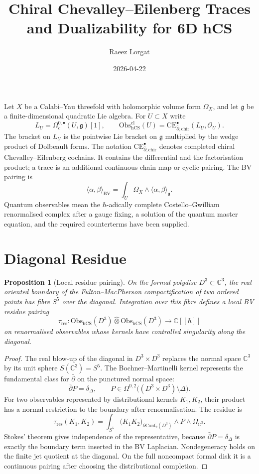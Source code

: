 \documentclass[11pt]{amsart}
\title{Chiral Chevalley--Eilenberg Traces and Dualizability for 6D hCS}
\author{Raeez Lorgat}
\date{2026-04-22}
\providecommand{\C}{\mathbb{C}}
\providecommand{\hb}{\hbar}
\providecommand{\dbar}{\bar{\partial}}
\providecommand{\Obs}{\mathrm{Obs}}
\providecommand{\hCS}{\mathrm{hCS}}
\providecommand{\CE}{\mathrm{CE}}
\providecommand{\cConf}{\overline{\mathrm{Conf}}}
\providecommand{\chir}{\mathrm{chir}}
\providecommand{\cO}{\mathcal{O}}
\providecommand{\g}{\mathfrak{g}}
\providecommand{\BV}{\mathrm{BV}}
\theoremstyle{plain}
\newtheorem{proposition}[theorem]{Proposition}
\theoremstyle{definition}
\theoremstyle{remark}
\begin{document}
\maketitle

Let $X$ be a Calabi--Yau threefold with holomorphic volume form
$\Omega_X$, and let $\g$ be a finite-dimensional quadratic Lie algebra.
For $U\subset X$ write
\[
 L_U=\Omega_c^{0,\bullet}(U,\g)[1],
 \qquad
 \Obs_{\hCS}^{\mathrm{cl}}(U)=\CE^\bullet_{\dbar,\chir}(L_U,\cO_U).
\]
The bracket on $L_U$ is the pointwise Lie bracket on $\g$ multiplied by
the wedge product of Dolbeault forms. The notation
$\CE^\bullet_{\dbar,\chir}$ denotes completed chiral
Chevalley--Eilenberg cochains. It contains the differential and the
factorisation product; a trace is an additional continuous chain map or
cyclic pairing. The BV pairing is
\[
 \langle\alpha,\beta\rangle_{\BV}
 =
 \int_U \Omega_X\wedge\langle\alpha,\beta\rangle_{\g}.
\]
Quantum observables mean the $\hb$-adically complete Costello--Gwilliam
renormalised complex after a gauge fixing, a solution of the quantum
master equation, and the required counterterms have been supplied.

\section{Diagonal Residue}

\begin{proposition}[Local residue pairing]\label{prop:local-residue-pairing}
On the formal polydisc $D^3\subset\C^3$, the real oriented boundary of
the Fulton--MacPherson compactification of two ordered points has fibre
$S^5$ over the diagonal. Integration over this fibre defines a local BV
residue pairing
\[
 \tau_{\mathrm{res}}:
 \Obs_{\hCS}(D^3)\widehat\otimes \Obs_{\hCS}(D^3)
 \longrightarrow \C[[\hb]]
\]
on renormalised observables whose kernels have controlled singularity
along the diagonal.
\end{proposition}

\begin{proof}
The real blow-up of the diagonal in $D^3\times D^3$ replaces the normal
space $\C^3$ by its unit sphere $S(\C^3)=S^5$. The Bochner--Martinelli
kernel represents the fundamental class for $\dbar$ on the punctured
normal space:
\[
 \dbar P=\delta_\Delta,
 \qquad
 P\in\Omega^{0,2}\bigl((D^3\times D^3)\setminus\Delta\bigr).
\]
For two observables represented by distributional kernels $K_1,K_2$,
their product has a normal restriction to the boundary after
renormalisation. The residue is
\[
 \tau_{\mathrm{res}}(K_1,K_2)
 =
 \int_{S^5}
 \bigl(K_1K_2\bigr)_{\partial\cConf_2(D^3)}\wedge P\wedge\Omega_{\C^3}.
\]
Stokes' theorem gives independence of the representative, because
$\dbar P=\delta_\Delta$ is exactly the boundary term inserted in the BV
Laplacian. Nondegeneracy holds on the finite jet quotient at the
diagonal. On the full noncompact formal disk it is a continuous pairing
after choosing the distributional completion.
\end{proof}
\end{document}
